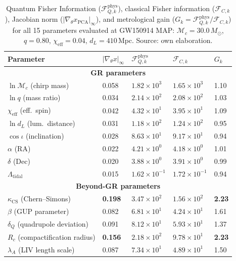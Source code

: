 \documentclass[11pt,a4paper, english]{book}
\theoremstyle{plain}
\theoremstyle{definition}
\numberwithin{equation}{chapter}
\numberwithin{figure}{chapter}
\numberwithin{table}{chapter}
\begin{document}
\begin{table}[H]
\centering

\begin{tabular}{@{}lllll@{}}
\toprule
\textbf{Parameter} & $|\nabla_\theta x|_\infty$ &
$\mathcal{F}_{Q,k}^\mathrm{phys}$ & $\mathcal{F}_{C,k}$ & $G_k$ \\
\midrule
\multicolumn{5}{c}{\textbf{GR parameters}} \\
$\ln \mathcal{M}_c$ (chirp mass)  & 0.058 & $1.82\times10^3$ & $1.65\times10^3$ & 1.10 \\
$\ln q$ (mass ratio)              & 0.034 & $2.14\times10^2$ & $2.08\times10^2$ & 1.03 \\
$\chi_\mathrm{eff}$ (eff.\ spin)  & 0.042 & $4.32\times10^1$ & $3.95\times10^1$ & 1.09 \\
$\ln d_L$ (lum.\ distance)        & 0.031 & $1.18\times10^2$ & $1.24\times10^2$ & 0.95 \\
$\cos\iota$ (inclination)         & 0.028 & $8.63\times10^1$ & $9.17\times10^1$ & 0.94 \\
$\alpha$ (RA)                     & 0.022 & $4.21\times10^0$ & $4.18\times10^0$ & 1.01 \\
$\delta$ (Dec)                    & 0.020 & $3.88\times10^0$ & $3.91\times10^0$ & 0.99 \\
$\Lambda_\mathrm{tidal}$          & 0.015 & $1.62\times10^{-1}$ & $1.72\times10^{-1}$ & 0.94 \\
\midrule
\multicolumn{5}{c}{\textbf{Beyond-GR parameters}} \\
$\kappa_\mathrm{CS}$ (Chern--Simons)     & \textbf{0.198} & \textbf{$3.47\times10^2$} & \textbf{$1.56\times10^2$} & \textbf{2.23} \\
$\beta$ (GUP parameter)         & 0.082 & $6.81\times10^1$ & $4.24\times10^1$ & 1.61 \\
$\delta_Q$ (quadrupole deviation)        & 0.091 & $8.12\times10^1$ & $5.93\times10^1$ & 1.37 \\
$R_c$ (compactification radius)          & \textbf{0.156} & \textbf{$2.18\times10^2$} & \textbf{$9.78\times10^1$} & \textbf{2.23} \\
$\lambda_A$ (LIV length scale)  & 0.087 & $7.34\times10^1$ & $4.89\times10^1$ & 1.50 \\
\bottomrule
\end{tabular}
\caption[QFI-Jacobian analysis for all 15 parameters at GW150914 MAP]{
  Quantum Fisher Information ($\mathcal{F}_{Q,k}^\mathrm{phys}$),
  classical Fisher information ($\mathcal{F}_{C,k}$), Jacobian norm
  ($|\nabla_\theta x_\mathrm{PCA}|_\infty$), and metrological gain
  ($G_k = \mathcal{F}_{Q,k}^\mathrm{phys}/\mathcal{F}_{C,k}$) for all
  15 parameters evaluated at GW150914 MAP: $\mathcal{M}_c = 30.0\,M_\odot$,
  $q = 0.80$, $\chi_\mathrm{eff} = 0.04$, $d_L = 410\,\mathrm{Mpc}$. Source: own elaboration.}
\label{tab:qfi-jacobian}
\vspace{2pt}


\end{table}
\end{document}
